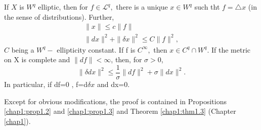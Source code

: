 \begin{theorem}\label{chap2:thm2.2}%
  If $X$ is $W^q$  elliptic, then for $f \in \mathcal{L}^q,$ there is
  a unique $x \in W^q$  
  such tht $f=\triangle x$ (in the sense of distributions). Further,
  \begin{gather*}
  \parallel x \parallel \leqslant c \parallel f \parallel\\ 
  \parallel dx \parallel^2 + \parallel \delta x \parallel ^2 \leqslant
  C \parallel f \parallel ^2,
  \end{gather*}
  $C$ being a $W^q -$ ellipticity constant. If f is $C^{\infty},$ then
  $x \in C^q\cap W^q$.  If the metric on X is complete and $\parallel
  df \parallel < \infty$, then, for $\sigma > 0$, 
  $$
  \parallel \delta dx \parallel ^2 \le \frac{1}{\sigma}\parallel df
  \parallel ^2 + \sigma \parallel dx \parallel ^2.
  $$  
  In particular, if df=0 , f=d$\delta x $ and dx=0.
  
  Except for obvious modifications, the proof is contained in
  Propositions \ref{chap1:prop1.2}  and \ref{chap1:prop1.3} and
  Theorem \ref{chap1:thm1.3} (Chapter \ref{chap1}).   
  

\end{theorem}
